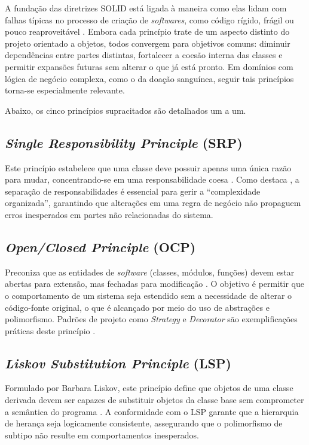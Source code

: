 A fundação das diretrizes SOLID está ligada à maneira como elas lidam com falhas típicas no processo de criação de \textit{softwares}, como código rígido, frágil ou pouco reaproveitável \cite{martin2003}. Embora cada princípio trate de um aspecto distinto do projeto orientado a objetos, todos convergem para objetivos comuns: diminuir dependências entre partes distintas, fortalecer a coesão interna das classes e permitir expansões futuras sem alterar o que já está pronto. Em domínios com lógica de negócio complexa, como o da doação sanguínea, seguir tais princípios torna-se especialmente relevante.

Abaixo, os cinco princípios supracitados são detalhados um a um.

\subsection{\textit{Single Responsibility Principle} (SRP)}

Este princípio estabelece que uma classe deve possuir apenas uma única razão para mudar, concentrando-se em uma responsabilidade coesa \cite{martin2003}. Como destaca , a separação de responsabilidades é essencial para gerir a ``complexidade organizada'', garantindo que alterações em uma regra de negócio não propaguem erros inesperados em partes não relacionadas do sistema.

\subsection{\textit{Open/Closed Principle} (OCP)}

Preconiza que as entidades de \textit{software} (classes, módulos, funções) devem estar abertas para extensão, mas fechadas para modificação \cite{martin2003}. O objetivo é permitir que o comportamento de um sistema seja estendido sem a necessidade de alterar o código-fonte original, o que é alcançado por meio do uso de abstrações e polimorfismo. Padrões de projeto como \textit{Strategy} e \textit{Decorator} são exemplificações práticas deste princípio \cite{gamma1994}.

\subsection{\textit{Liskov Substitution Principle} (LSP)}

Formulado por Barbara Liskov, este princípio define que objetos de uma classe derivada devem ser capazes de substituir objetos da classe base sem comprometer a semântica do programa \cite{martin2003}. A conformidade com o LSP garante que a hierarquia de herança seja logicamente consistente, assegurando que o polimorfismo de subtipo não resulte em comportamentos inesperados.

